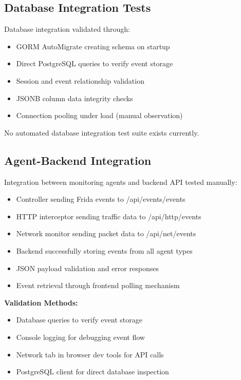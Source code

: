 \begin{itemize}
\subsection{Database Integration Tests}

Database integration validated through:

\begin{itemize}
    \item GORM AutoMigrate creating schema on startup
    \item Direct PostgreSQL queries to verify event storage
    \item Session and event relationship validation
    \item JSONB column data integrity checks
    \item Connection pooling under load (manual observation)
\end{itemize}

No automated database integration test suite exists currently.

\subsection{Agent-Backend Integration}

Integration between monitoring agents and backend API tested manually:

\begin{itemize}
    \item Controller sending Frida events to /api/events/events
    \item HTTP interceptor sending traffic data to /api/http/events
    \item Network monitor sending packet data to /api/net/events
    \item Backend successfully storing events from all agent types
    \item JSON payload validation and error responses
    \item Event retrieval through frontend polling mechanism
\end{itemize}

\textbf{Validation Methods:}
\begin{itemize}
    \item Database queries to verify event storage
    \item Console logging for debugging event flow
    \item Network tab in browser dev tools for API calls
    \item PostgreSQL client for direct database inspection
\end{itemize}


\end{itemize}
